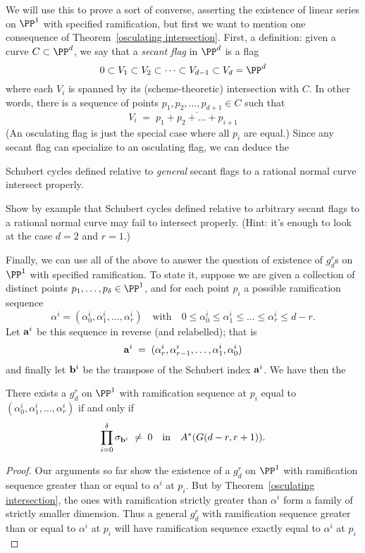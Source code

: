We will use this to prove a sort of converse, asserting the existence of linear series on $\PP^1$ with specified ramification, but first we want to mention one consequence of Theorem~\ref{osculating intersection}. First, a definition: given a curve $C \subset \PP^d$, we say that a \emph{secant flag} in $\PP^d$ is a flag
$$
0 \subset V_1 \subset V_2 \subset \dots \subset V_{d-1} \subset V_d = \PP^d
$$
where each $V_i$ is spanned by its (scheme-theoretic) intersection with $C$. In other words, there is a sequence of points $p_1, p_2, \dots, p_{d+1} \in C$ such that
$$
V_i \; = \; \overline{p_1+p_2+ \dots + p_{i+1}}
$$
(An osculating flag is just the special case where all $p_i$ are equal.) Since any secant flag can specialize to an osculating flag, we can deduce the

\begin{corollary}\label{secant schubert proper}
Schubert cycles defined relative to \emph{general} secant flags to a rational normal curve intersect properly.
\end{corollary} 

\begin{exercise}
Show by example that Schubert cycles defined relative to arbitrary secant flags to a rational normal curve may fail to intersect properly. (Hint: it's enough to look at the case $d=2$ and $r=1$.)
\end{exercise}

Finally, we can use all of the above to answer the question of existence of $g^r_d$s on $\PP^1$ with specified ramification. To state it, suppose we are given a collection of distinct points $p_1,\dots,p_\delta \in \PP^1$, and for each point $p_i$ a possible ramification sequence
$$
\alpha^i = (\alpha^i_0, \alpha^i_1, \dots, \alpha^i_r) \quad \text{with} \quad 0 \leq \alpha^i_0 \leq \alpha^i_1 \leq \dots \leq \alpha^i_r \leq d-r.
$$
Let ${\bf a}^i$ be this sequence in reverse (and relabelled); that is
$$
{\bf a}^i \; = \; (\alpha^i_r, \alpha^i_{r-1}, \dots, \alpha^i_1, \alpha^i_0)
$$
and finally let ${\bf b}^i$ be the transpose of the Schubert index ${\bf a}^i$. We have then the

\begin{theorem}
There exists a $g^r_d$ on $\PP^1$ with ramification sequence at $p_i$ equal to $(\alpha^i_0, \alpha^i_1, \dots, \alpha^i_r)$ if and only if 
$$
\prod_{i=0}^\delta  \sigma_{{\bf b}^i} \; \neq \; 0 \quad \text{in} \quad A^*(G(d-r, r+1)).
$$
\end{theorem}

\begin{proof}
Our arguments so far show the existence of a $g^r_d$ on $\PP^1$ with ramification sequence greater than or equal to $\alpha^i$ at $p_i$. But by Theorem~\ref{osculating intersection}, the ones with ramification strictly greater than $\alpha^i$ form a family of strictly smaller dimension. Thus a general $g^r_d$ with ramification sequence greater than or equal to $\alpha^i$ at $p_i$ will have  ramification sequence exactly equal to $\alpha^i$ at $p_i$
\end{proof}

